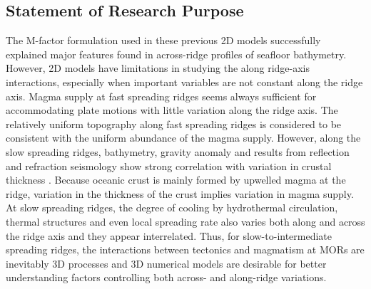 \subsection{Statement of Research Purpose}
The M-factor formulation used in these previous 2D models successfully explained major features found in across-ridge profiles of seafloor bathymetry. However, 2D models have limitations in studying the along ridge-axis interactions, especially when important variables are not constant along the ridge axis. Magma supply at fast spreading ridges seems always sufficient for accommodating plate motions with little variation along the ridge axis. The relatively uniform topography along fast spreading ridges is considered to be consistent with the uniform abundance of the magma supply. However, along the slow spreading ridges, bathymetry, gravity anomaly and results from reflection and refraction seismology show strong correlation with variation in crustal thickness \citep{Ryan2009, Chen1999, Lin1990, Tolstoy1993}. Because oceanic crust is mainly formed by upwelled magma at the ridge, variation in the thickness of the crust implies variation in magma supply. At slow spreading ridges, the degree of cooling by hydrothermal circulation, thermal structures and even local spreading rate \citep{Baines2008} also varies both along and across the ridge axis and they appear interrelated. Thus, for slow-to-intermediate spreading ridges, the interactions between tectonics and magmatism at MORs are inevitably 3D processes and 3D numerical models are desirable for better understanding factors controlling both across- and along-ridge variations. 


